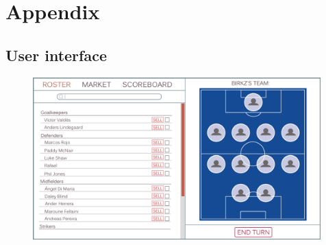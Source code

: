 \documentclass{article}
\begin{document}
\newpage
\section*{Appendix}
\subsection*{User interface}
\begin{figure}[H]
\centering
\includegraphics[width=0.99\textwidth]{ffUI.png}
\end{figure}
\end{document}
